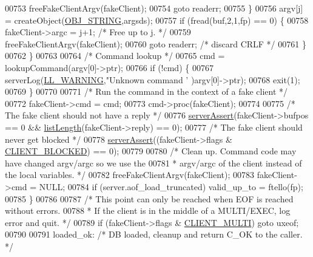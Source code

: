 \begin{DoxyCode}
{{{{{{{{{{00753                 freeFakeClientArgv(fakeClient);
00754                 \textcolor{keywordflow}{goto} readerr;
00755             \}
00756             argv[j] = createObject(\hyperlink{server_8h_a65236ea160f69cdef33ec942092af88f}{OBJ\_STRING},argsds);
00757             \textcolor{keywordflow}{if} (fread(buf,2,1,fp) == 0) \{
00758                 fakeClient->argc = j+1; \textcolor{comment}{/* Free up to j. */}
00759                 freeFakeClientArgv(fakeClient);
00760                 \textcolor{keywordflow}{goto} readerr; \textcolor{comment}{/* discard CRLF */}
00761             \}
00762         \}
00763 
00764         \textcolor{comment}{/* Command lookup */}
00765         cmd = lookupCommand(argv[0]->ptr);
00766         \textcolor{keywordflow}{if} (!cmd) \{
00767             serverLog(\hyperlink{server_8h_a31229b9334bba7d6be2a72970967a14b}{LL\_WARNING},\textcolor{stringliteral}{"Unknown command '%
      )argv[0]->ptr);
00768             exit(1);
00769         \}
00770 
00771         \textcolor{comment}{/* Run the command in the context of a fake client */}
00772         fakeClient->cmd = cmd;
00773         cmd->proc(fakeClient);
00774 
00775         \textcolor{comment}{/* The fake client should not have a reply */}
00776         \hyperlink{server_8h_a88114b5169b4c382df6b56506285e56a}{serverAssert}(fakeClient->bufpos == 0 && \hyperlink{adlist_8h_afde0ab079f934670e82119b43120e94b}{listLength}(fakeClient->reply) ==
       0);
00777         \textcolor{comment}{/* The fake client should never get blocked */}
00778         \hyperlink{server_8h_a88114b5169b4c382df6b56506285e56a}{serverAssert}((fakeClient->flags & \hyperlink{server_8h_a503ad979164a52f0f5e2a63e4c7da3a0}{CLIENT\_BLOCKED}) == 0);
00779 
00780         \textcolor{comment}{/* Clean up. Command code may have changed argv/argc so we use the}
00781 \textcolor{comment}{         * argv/argc of the client instead of the local variables. */}
00782         freeFakeClientArgv(fakeClient);
00783         fakeClient->cmd = NULL;
00784         \textcolor{keywordflow}{if} (server.aof\_load\_truncated) valid\_up\_to = ftello(fp);
00785     \}
00786 
00787     \textcolor{comment}{/* This point can only be reached when EOF is reached without errors.}
00788 \textcolor{comment}{     * If the client is in the middle of a MULTI/EXEC, log error and quit. */}
00789     \textcolor{keywordflow}{if} (fakeClient->flags & \hyperlink{server_8h_a7f61f783f429419f8c593291a509b03a}{CLIENT\_MULTI}) \textcolor{keywordflow}{goto} uxeof;
00790 
00791 loaded\_ok: \textcolor{comment}{/* DB loaded, cleanup and return C\_OK to the caller. */}
}}}}}}}}}}}
\end{DoxyCode}
